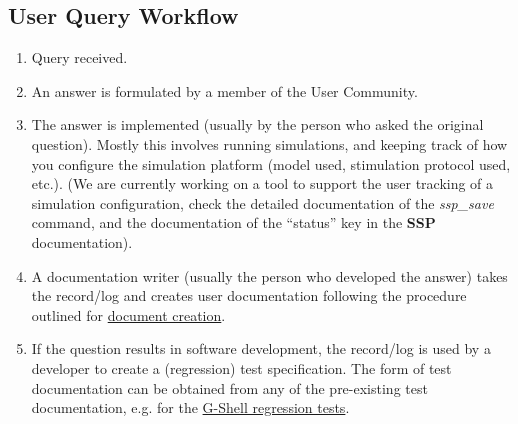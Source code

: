 \documentclass[12pt]{article}
\begin{document}
\subsection*{User Query Workflow}

\begin{enumerate}
\item Query received.
\item An answer is formulated by a member of the User Community.
\item The answer is implemented (usually by the person who asked the
  original question).  Mostly this involves running simulations, and
  keeping track of how you configure the simulation platform (model used, stimulation protocol used, etc.).  (We are currently working
  on a tool to support the user tracking of a simulation
  configuration, check the detailed documentation of the {\it ssp\_save}
  command, and the documentation of the ``status'' key in the {\bf SSP}
  documentation).
\item A documentation writer (usually the person who developed the
  answer) takes the record/log and creates user documentation
  following the procedure outlined for
  \href{../document-create/document-create.tex}{document creation}.
\item If the question results in software development, the record/log
  is used by a developer to create a (regression) test specification.
  The form of test documentation can be obtained from any of the
  pre-existing test documentation, e.g. for the
  \href{../tests-gshell/tests-gshell.tex}{G-Shell regression tests}.
\end{enumerate}
\end{document}
